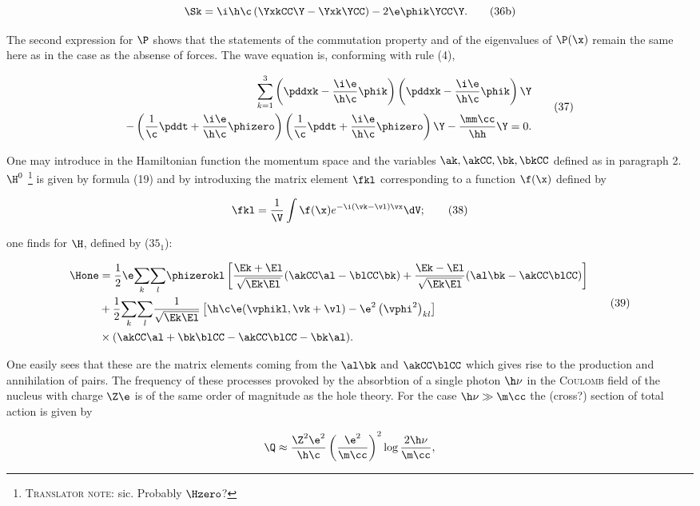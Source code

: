\documentclass{article}
\newcommand{\const}[1]{#1}
\newcommand{\comp}[1]{{#1}}
\newcommand{\inv}[1]{\frac{1}{#1}}
\renewcommand{\exp}[1]{\const{e}^{#1}}
\renewcommand{\sc}[1]{\textsc{#1}}
\newcommand{\sumXY}[2]{\underset{#1}{\overset{#2}{\sum}}}
\newcommand{\sumk}{\underset{k}{\sum}}
\newcommand{\suml}{\underset{l}{\sum}}
\newcommand{\inner}[2]{(#1, #2)}
\newcommand{\nequ}[2]{
\begin{equation*}
#1
\tag{#2}
\end{equation*}
}
\newcommand{\uequ}[1]{
\begin{equation*}
#1
\end{equation*}
}
\newcommand{\TN}[1]{
\footnote{\sc{Translator note}: #1}
}
\begin{document}
\nequ{
\Sk = \i\h\c\left(
\YxkCC\Y - \Yxk\YCC
\right) - 2\e\phik\YCC\Y.
}{36b}

The second expression for $\P$ shows that the statements of the commutation property and of the eigenvalues of $\P(\x)$ remain the same here as in the case as the absense of forces.
The wave equation is, conforming with rule (4),

\nequ{
\begin{split}
\sumXY{k=1}{3}\left(
  \pddxk - \frac{\i\e}{\h\c}\phik
\right)\left(
  \pddxk - \frac{\i\e}{\h\c}\phik
\right)\Y \\
-\left(
\inv{\c}\pddt + \frac{\i\e}{\h\c}\phizero
\right)\left(
\inv{\c}\pddt + \frac{\i\e}{\h\c}\phizero
\right)\Y - \frac{\mm\cc}{\hh}\Y = 0.
\end{split}
}{37}

One may introduce in the Hamiltonian function the momentum space and the variables $\ak, \akCC, \bk, \bkCC$ defined as in paragraph 2. $\H^0$ \TN{sic. Probably $\Hzero$?} is given by formula (19) and by introduxing the matrix element $\fkl$ corresponding to a function $\f(\x)$ defined by

\nequ{
\fkl = \inv{\V}\int\f(\x)\exp{-\i(\vk - \vl)\vx}\dV;
}{38}

one finds for $\H$, defined by ($35_1$):

\nequ{
\begin{split}
\Hone &= \inv{2}\e\sumk\suml\phizerokl\left[
\frac{\Ek + \El}{\sqrt{\Ek\El}}(\akCC\al - \blCC\bk) + \frac{\Ek - \El}{\sqrt{\Ek\El}}(\al\bk - \akCC\blCC)
\right] \\
 &+ \inv{2}\sumk\suml\inv{\sqrt{\Ek\El}}
 \left[
   \h\c\e\inner{\vphikl}{\vk + \vl} - \e^2\left(
   \vphi^2\right)_{\comp{kl}}
 \right] \\
 &\times(\akCC\al + \bk\blCC - \akCC\blCC - \bk\al).
\end{split}
}{39}

One easily sees that these are the matrix elements coming from the $\al\bk$ and $\akCC\blCC$ which gives rise to the production and annihilation of pairs.
The frequency of these processes provoked by the absorbtion of a single photon $\h\nu$ in the \sc{Coulomb} field of the nucleus with charge $\Z\e$ is of the same order of magnitude as the hole theory. For the case $\h\nu \gg \m\cc$ the (cross?) section of total action is given by

\uequ{
\Q \approx \frac{\Z^2\e^2}{\h\c}\left(\frac{\e^2}{\m\cc}\right)^2\log{\frac{2\h\nu}{\m\cc}},
}
\end{document}
